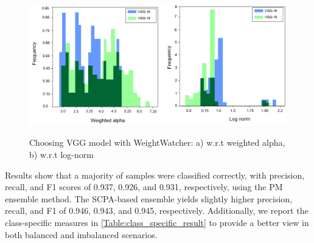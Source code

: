 \documentclass[conference]{IEEEtran}
\begin{document}
\begin{figure}
	\centering
	\includegraphics[width=0.9\linewidth,height=60mm]{ww.png}
	\caption{Choosing VGG model with WeightWatcher: a) w.r.t weighted alpha, b) w.r.t log-norm}
	\label{fig:weight_watch}
\end{figure}
\fi

Results show that a majority of samples were classified correctly, with precision, recall, and F1 scores of 0.937, 0.926, and 0.931, respectively, using the PM ensemble method. The SCPA-based ensemble yields slightly higher precision, recall, and F1 of 0.946, 0.943, and 0.945, respectively. Additionally, we report the class-specific measures in \cref{Table:class_specific_result} to provide a better view in both balanced and imbalanced scenarios.
\end{document}
